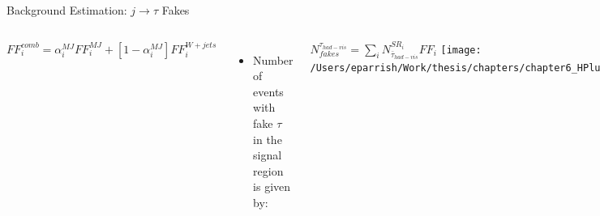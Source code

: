 \documentclass[aspectratio=169,xcolor=table]{beamer}
\begin{document}
\begin{frame}[t]{Background Estimation: $j \rightarrow \tau$ Fakes}
\begin{columns}[t]
            \centering
            \footnotesize
            $FF^{comb}_{i}=\alpha^{MJ}_{i} FF^{MJ}_{i} + [1-\alpha^{MJ}_{i}]FF^{W+jets}_{i}$
          \begin{itemize}
          \item Number of events with fake $\tau$ in the signal region is given by:
        \end{itemize}
          \centering
          \footnotesize
          $N^{\tau_{had-vis}}_{fakes} = \sum\limits_{i} N^{SR_{i}}_{\bar{\tau}_{had-vis}} FF_{i}$
      \centering
      \texttt{[image: /Users/eparrish/Work/thesis/chapters/chapter6\_HPlus/images/FFs/FFs\_FIT\_SR\_TAUJET\_1\_40\_45.png]}
        \begin{itemize}
          \tiny
          \item $\bar{\tau_{0}}$ jet width used in $\alpha$ fitting of 1-prong and 3-prong $\bar{\tau}$
        \end{itemize}
         \begin{table}
          \end{table}
      \end{columns}
    \end{frame}

\end{document}
